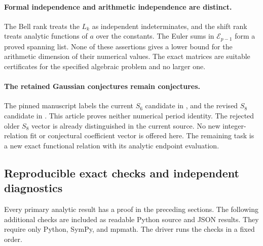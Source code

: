 \paragraph{Formal independence and arithmetic independence are distinct.}
The Bell rank treats the $L_k$ as independent indeterminates, and the
shift rank treats analytic functions of $a$ over the constants.
The Euler sums in $\mathcal E_{p-1}$ form a proved spanning list.
None of these assertions gives a lower bound for the arithmetic
dimension of their numerical values. The exact matrices are suitable
certificates for the specified algebraic problem and no larger one.

\paragraph{The retained Gaussian conjectures remain conjectures.}
The pinned manuscript labels the current $S_6$ candidate
 in
, and the revised $S_8$
candidate  in
 \cite{RepoMain}.
This article proves neither numerical period identity. The rejected
older $S_8$ vector is already distinguished in the current source.
No new integer-relation fit or conjectural coefficient vector is
offered here. The remaining task is a new exact functional relation
with its analytic endpoint evaluation.

\subsection{Reproducible exact checks and independent diagnostics}

Every primary analytic result has a proof in the preceding sections.
The following additional checks are included as readable Python source
and JSON results. They require only Python, SymPy, and mpmath.
The driver  runs the checks in a fixed order.


